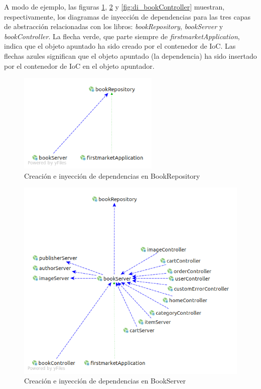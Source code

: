 \documentclass[a4paper]{article}
\begin{document}
    A modo de ejemplo, las figuras \ref{fig:di_bookRepository}, \ref{fig:di_bookServer} y \ref{fig:di_bookController} muestran, respectivamente, los diagramas de inyección de dependencias para las tres capas de abstracción relacionadas con los libros: \emph{bookRepository}, \emph{bookServer} y \emph{bookController}. La flecha verde, que parte siempre de \emph{firstmarketApplication}, indica que el objeto apuntado ha sido creado por el contenedor de IoC. Las flechas azules significan que el objeto apuntado (la dependencia) ha sido insertado por el contenedor de IoC en el objeto apuntador.

	\begin{figure}[htb!]
		\centering
		\includegraphics[width=0.6\textwidth]{di_bookRepository}
		\caption{Creación e inyección de dependencias en BookRepository}
		\label{fig:di_bookRepository}
	\end{figure}

	\begin{figure}[htb!]
		\centering
		\includegraphics[width=\textwidth]{di_bookServer}
		\caption{Creación e inyección de dependencias en BookServer}
		\label{fig:di_bookServer}
	\end{figure}
\end{document}
